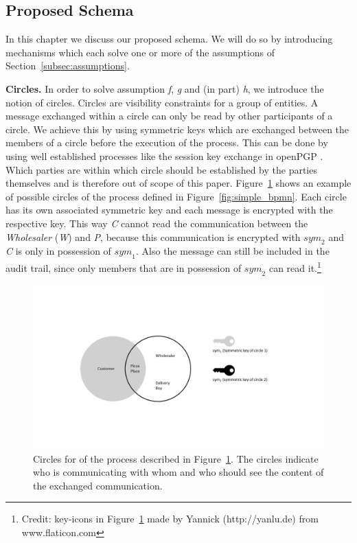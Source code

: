 \documentclass[runningheads]{llncs}
\newcommand{\ber}[1]{\textit{#1}}
\newcommand{\reffig}[1]{Figure~\ref{#1}}
\newcommand{\refsec}[1]{Section~\ref{#1}}
\begin{document}
\subsection{Proposed Schema} \label{subsec:schema}

In this chapter we discuss our proposed schema. We will do so by introducing mechanisms which each solve one or more of the assumptions of \refsec{subsec:assumptions}.



\textbf{Circles.} In order to solve assumption \ber{f}, \ber{g} and (in part) \ber{h}, we introduce the notion of circles. Circles are visibility constraints for a group of entities. A message exchanged within a circle can only be read by other participants of a circle. We achieve this by using symmetric keys which are exchanged between the members of a circle before the execution of the process. This can be done by using well established processes like the session key exchange in openPGP \cite{openpgp}. Which parties are within which circle should be established by the parties themselves and is therefore out of scope of this paper. \reffig{fig:circles} shows an example of possible circles of the process defined in  \reffig{fig:simple_bpmn}. Each circle has its own associated symmetric key and each message is encrypted with the respective key. This way \ber{C} cannot read the communication between the \ber{Wholesaler} (\ber{W}) and \ber{P}, because this communication is encrypted with ${sym}_2$ and \ber{C} is only in possession of ${sym}_1$. Also the message can still be included in the audit trail, since only members that are in possession of ${sym}_2$ can read it.\footnote{Credit: key-icons in \reffig{fig:circles} made by Yannick (http://yanlu.de) from www.flaticon.com}


\begin{center}
\begin{figure}
    \centering
    \includegraphics[trim=5cm 5cm 6cm 5.6cm,clip=true,scale=0.5]{circles.png}
    \caption{Circles for of the process described in \reffig{fig:circles}. The circles indicate who is communicating with whom and who should see the content of the exchanged communication.} 
    \label{fig:circles}
\end{figure}
\end{center}
\end{document}
